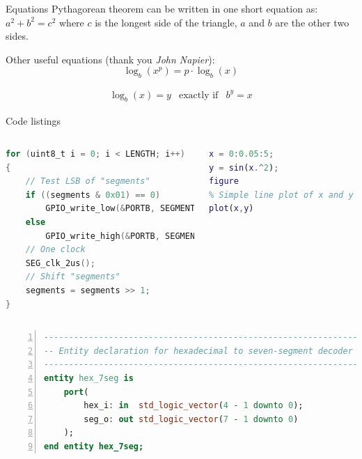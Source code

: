 \documentclass[aspectratio=1610]{beamer}
\begin{document}
\begin{frame}{Equations}
    Pythagorean theorem can be written in one short equation as: $a^2 + b^2 = c^2$ where $c$ is the longest side of the triangle, $a$ and $b$ are the other two sides.

    \vfill %

    Other useful equations (thank you \textit{John Napier}):
    \begin{equation}
        \log_b (x^p) = p\cdot \log_b (x)
    \end{equation}

    \begin{eqnarray*}
        \log_b(x) = y & \text{exactly if} & b^y = x
    \end{eqnarray*}
\end{frame}


\begin{frame}[fragile]{Code listings}

    \vspace*{-.5cm}
    \begin{columns}
\begin{lstlisting}[language=C,title={C example}]
for (uint8_t i = 0; i < LENGTH; i++)
{
    // Test LSB of "segments"
    if ((segments & 0x01) == 0)
        GPIO_write_low(&PORTB, SEGMENT_DATA);
    else
        GPIO_write_high(&PORTB, SEGMENT_DATA);
    // One clock
    SEG_clk_2us();
    // Shift "segments"
    segments = segments >> 1;
}
\end{lstlisting}

\begin{lstlisting}[language=Matlab,caption={Matlab example}]
x = 0:0.05:5;
y = sin(x.^2);
figure
% Simple line plot of x and y values
plot(x,y)
\end{lstlisting}
    \end{columns}

\begin{lstlisting}[language=vhdl,title={VHDL example},numbers=left]
---------------------------------------------------------------
-- Entity declaration for hexadecimal to seven-segment decoder
---------------------------------------------------------------
entity hex_7seg is
    port(
        hex_i: in  std_logic_vector(4 - 1 downto 0);
        seg_o: out std_logic_vector(7 - 1 downto 0)
    );
end entity hex_7seg;
\end{lstlisting}
\end{frame}
\end{document}
